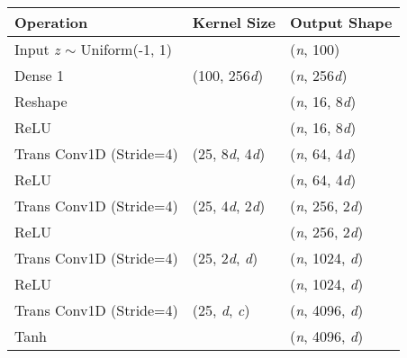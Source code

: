 \documentclass[a4paper, dvipsnames, titlepage]{article}
\begin{document}
\begin{appendices}
\begin{table}[h]
\begin{center}
\begin{tabular}{ l | l | l}
        Operation & Kernel Size & Output Shape \\
        \hline
        Input {\it z} $\sim$ Uniform(-1, 1) & & ({\it n}, 100) \\
        Dense 1 & (100, 256{\it d}) & ({\it n}, 256{\it d}) \\
        Reshape & & ({\it n}, 16, 8{\it d}) \\
        ReLU & & ({\it n}, 16, 8{\it d}) \\
        Trans Conv1D (Stride=4) & (25, 8{\it d}, 4{\it d}) & ({\it n}, 64, 4{\it d}) \\
        ReLU & & ({\it n}, 64, 4{\it d}) \\
        Trans Conv1D (Stride=4) & (25, 4{\it d}, 2{\it d}) & ({\it n}, 256, 2{\it d}) \\
        ReLU & & ({\it n}, 256, 2{\it d}) \\
        Trans Conv1D (Stride=4) & (25, 2{\it d}, {\it d}) & ({\it n}, 1024, {\it d}) \\
        ReLU & & ({\it n}, 1024, {\it d}) \\
        Trans Conv1D (Stride=4) & (25, {\it d}, {\it c}) & ({\it n}, 4096, {\it d}) \\
        Tanh & & ({\it n}, 4096, {\it d}) \\

      \end{tabular}
    \end{center}
    
  \end{table}
  
\end{appendices}

\end{document}
